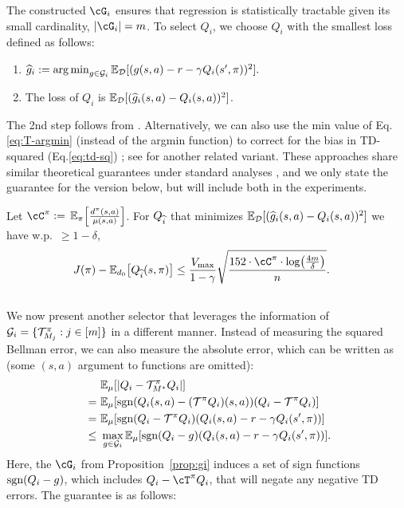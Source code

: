 %
%
%
The constructed $\cG_i$ ensures that regression is statistically tractable 
given its small cardinality, $\abr{\cG_i}=m$. 
%
%
%
%
To select $Q_i$, 
we choose $Q_i$ with the smallest loss defined as follows:
%
\begin{enumerate}[leftmargin=*, itemsep=1pt, topsep=0.2pt, parsep=0pt, partopsep=0pt]
\item  $\widehat{g}_i:=
\operatorname*{arg\,min}_{g\in\mathcal{G}_i} \mathbb{E}_{\mathcal{D}}[(g(s,a) - r - \gamma Q_i(s',\pi))^2].$
\item The loss of $Q_i$ is $\mathbb{E}_{\mathcal{D}}[(\widehat{g}_i(s,a) - 
Q_i(s,a))^2]$.
%
\end{enumerate}
The 2nd step follows from \cite{zitovsky2023revisiting}. 
%
%
%
%
%
%
%
%
%
Alternatively, we can also use the min value of Eq.\eqref{eq:T-argmin} (instead of the argmin function) to correct for the bias in TD-squared (Eq.\eqref{eq:td-sq}) \cite{antos2008learning};  see \cite{liu2023offline} for another related variant. These approaches share similar theoretical guarantees under standard analyses \cite{xie2020batch, xie2021bellman}, and we only state the guarantee for the \cite{zitovsky2023revisiting} version below, but will include both in the experiments.
%
%
%
%
%
%
%
%
%
%
%
%

\begin{theorem}\label{thm:model}
Let $\Cone \ldef{} \En_{\pi}\sbr*{\frac{d^\pi(s,a)}{\mu(s,a)}}$.
%
For $Q_{\widehat{i}}$ that minimizes $\mathbb{E}_{\mathcal{D}}[(\widehat{g}_i(s,a) - Q_i(s,a))^2]$ 
we have w.p.~$\ge 1-\delta$,
\begin{align}
 J(\pi) - \En_{d_{0}}\sbr*{Q_{\ihat}(s,\pi)} 
 & \le  \frac{\Vmax}{1-\gamma} \sqrt{\frac{152\cdot\Cone\cdot\log\rbr*{\frac{4m}{\delta} }}{n}}.
\end{align}
%
\end{theorem}

\subsection{\absind}
%
We  now present another  selector that leverages the information of $\mathcal{G}_i = \{\mathcal{T}_{M_j}^\pi: j\in[m]\}$ in a different manner. Instead of measuring the squared Bellman error, we can also measure the absolute error, which can be written as (some $(s,a)$ argument to functions are omitted): 
%
%
%
%
%
%
%
%
%
%
%
\begin{align}
&~ \mathbb{E}_{\mu}[|Q_i - \mathcal{T}_{M^\star}^\pi Q_i|] \\
= &~ \mathbb{E}_{\mu}[\textrm{sgn}(Q_i(s,a) - (\mathcal{T}^\pi Q_i)(s,a))(Q_i - \mathcal{T}^\pi Q_i)] \\
= &~ \mathbb{E}_{\mu}[\textrm{sgn}(Q_i - \mathcal{T}^\pi Q_i)(Q_i(s,a) - r - \gamma Q_i(s',\pi))] \\  \label{eq:saber}
\le &~ \max_{g\in\mathcal{G}_i} \mathbb{E}_{\mu}[\textrm{sgn}(Q_i - g) (Q_i(s,a) - r - \gamma Q_i(s',\pi))]. \hspace{-.5em}
\end{align}
%
%
%
Here, the $\cG_i$ from Proposition~\ref{prop:gi}
induces a set of sign functions $\textrm{sgn}(Q_i - g)$, 
which includes $Q_i - \Tpi Q_i$, 
that will negate any negative TD errors. %
%
%
The guarantee is as follows:

